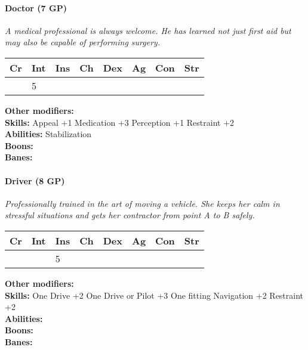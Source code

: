 \documentclass[12pt,a4paper,openany]{book}
\begin{document}
	\hrulefill
	\paragraph*{Doctor (7 GP)}
	\textit{A medical professional is always welcome. He has learned not just first aid but may also be capable of performing surgery.}\par
	\begin{tabular}{|l|l|l|l|l|l|l|l|}
		\hline
		Cr & Int & Ins & Ch & Dex & Ag & Con & Str \\ \hline
		& 5 &  &  &  &  &  &  \\ \hline
	\end{tabular}\par
	\noindent\textbf{Other modifiers:} \\
	\textbf{Skills:} Appeal +1
	Medication +3
	Perception +1
	Restraint +2\\
	\textbf{Abilities:} Stabilization\\
	\textbf{Boons:} \\
	\textbf{Banes:} \\
	
	\hrulefill
	\paragraph*{Driver (8 GP)}
	\textit{Professionally trained in the art of moving a vehicle. She keeps her calm in stressful situations and gets her contractor from point A to B safely.}\par
	\begin{tabular}{|l|l|l|l|l|l|l|l|}
		\hline
		Cr & Int & Ins & Ch & Dex & Ag & Con & Str \\ \hline
		&  & 5 &  &  &  &  &  \\ \hline
	\end{tabular}\par
	\noindent\textbf{Other modifiers:} \\
	\textbf{Skills:} One Drive +2
	One Drive or Pilot +3
	One fitting Navigation +2
	Restraint +2\\
	\textbf{Abilities:} \\
	\textbf{Boons:} \\
	\textbf{Banes:} \\
	
	\hrulefill
\end{document}
